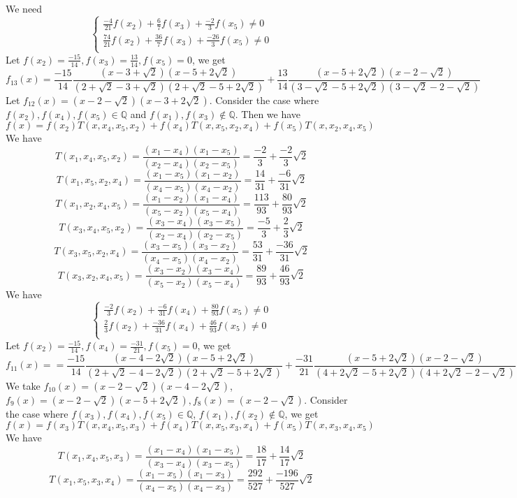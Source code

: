 \documentclass[english, 10pt]{article} %
\begin{document}
We need
$$\begin{cases}
\frac{-4}{21}f(x_2)+\frac{6}{7}f(x_3)+\frac{-2}{3}f(x_5) \neq 0\\
\frac{74}{21}f(x_2)+\frac{36}{7}f(x_3)+\frac{-26}{3}f(x_5) \neq 0\\
\end{cases}$$
Let $f(x_2)=\frac{-15}{14}, f(x_3)=\frac{13}{14}, f(x_5)=0$, we get
$$f_{13}(x) = \frac{-15}{14} \frac{(x-3+\sqrt{2})(x-5+2\sqrt{2})}{(2+\sqrt{2}-3+\sqrt{2})(2+\sqrt{2}-5+2\sqrt{2})} + \frac{13}{14} \frac{(x-5+2\sqrt{2})(x-2-\sqrt{2})}{(3-\sqrt{2}-5+2\sqrt{2})(3-\sqrt{2}-2-\sqrt{2})}$$
Let $f_{12}(x)=(x-2-\sqrt{2})(x-3+2\sqrt{2})$. Consider the case where $f(x_2),f(x_4),f(x_5) \in \mathbb{Q}$ and $f(x_1),f(x_3) \not \in \mathbb{Q}$. Then we have
$$f(x) = f(x_2)T(x,x_4,x_5,x_2)+f(x_4)T(x,x_5,x_2,x_4)+f(x_5)T(x,x_2,x_4,x_5)$$
We have
$$T(x_1,x_4,x_5,x_2) = \frac{(x_1-x_4)(x_1-x_5)}{(x_2-x_4)(x_2-x_5)} = \frac{-2}{3}+\frac{-2}{3}\sqrt{2}$$
$$T(x_1,x_5,x_2,x_4) = \frac{(x_1-x_5)(x_1-x_2)}{(x_4-x_5)(x_4-x_2)} = \frac{14}{31}+\frac{-6}{31}\sqrt{2}$$
$$T(x_1,x_2,x_4,x_5) = \frac{(x_1-x_2)(x_1-x_4)}{(x_5-x_2)(x_5-x_4)}= \frac{113}{93}+\frac{80}{93}\sqrt{2}$$
$$T(x_3,x_4,x_5,x_2) = \frac{(x_3-x_4)(x_3-x_5)}{(x_2-x_4)(x_2-x_5)} = \frac{-5}{3}+\frac{2}{3}\sqrt{2}$$
$$T(x_3,x_5,x_2,x_4) = \frac{(x_3-x_5)(x_3-x_2)}{(x_4-x_5)(x_4-x_2)} = \frac{53}{31}+\frac{-36}{31}\sqrt{2}$$
$$T(x_3,x_2,x_4,x_5) = \frac{(x_3-x_2)(x_3-x_4)}{(x_5-x_2)(x_5-x_4)}= \frac{89}{93}+\frac{46}{93}\sqrt{2}$$
We have
$$\begin{cases}
\frac{-2}{3}f(x_2)+\frac{-6}{31}f(x_4)+\frac{80}{93}f(x_5) \neq 0\\
\frac{2}{3}f(x_2)+\frac{-36}{31}f(x_4)+\frac{46}{93}f(x_5) \neq 0\\
\end{cases}$$
Let $f(x_2)=\frac{-15}{14},f(x_4)=\frac{-31}{21},f(x_5)=0$, we get
$$f_{11}(x) = =\frac{-15}{14} \frac{(x-4-2\sqrt{2})(x-5+2\sqrt{2})}{(2+\sqrt{2}-4-2\sqrt{2})(2+\sqrt{2}-5+2\sqrt{2})} + \frac{-31}{21} \frac{(x-5+2\sqrt{2})(x-2-\sqrt{2})}{(4+2\sqrt{2}-5+2\sqrt{2})(4+2\sqrt{2}-2-\sqrt{2})}$$
We take $f_{10}(x) = (x-2-\sqrt{2})(x-4-2\sqrt{2})$, $f_9(x) = (x-2-\sqrt{2})(x-5+2\sqrt{2}), f_8(x) = (x-2-\sqrt{2})$. Consider the case where $f(x_3),f(x_4),f(x_5) \in \mathbb{Q}$, $f(x_1),f(x_2) \not \in \mathbb{Q}$, we get
$$f(x) = f(x_3)T(x,x_4,x_5,x_3)+f(x_4)T(x,x_5,x_3,x_4)+f(x_5)T(x,x_3,x_4,x_5)$$
We have
$$T(x_1,x_4,x_5,x_3) = \frac{(x_1-x_4)(x_1-x_5)}{(x_3-x_4)(x_3-x_5)} = \frac{18}{17}+\frac{14}{17}\sqrt{2}$$
$$T(x_1,x_5,x_3,x_4) = \frac{(x_1-x_5)(x_1-x_3)}{(x_4-x_5)(x_4-x_3)} = \frac{292}{527}+\frac{-196}{527}\sqrt{2}$$
\end{document}
